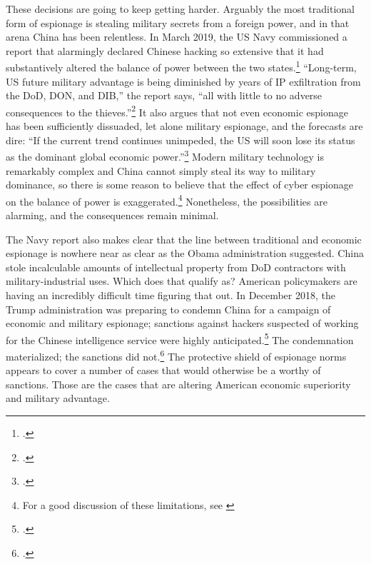 \documentclass{memoir}
\begin{document}
\begin{refsegment}
These decisions are going to keep getting harder. Arguably the most traditional form of espionage is stealing military secrets from a foreign power, and in that arena China has been relentless. In March 2019, the US Navy commissioned a report that alarmingly declared Chinese hacking so extensive that it had substantively altered the balance of power between the two states.\footcite{lubold_navy_2019} ``Long-term, US future military advantage is being diminished by years of IP exfiltration from the DoD, DON, and DIB,'' the report says, ``all with little to no adverse consequences to the thieves.''\footcite[p.~6]{bayer_cybersecurity_2019} It also argues that not even economic espionage has been sufficiently dissuaded, let alone military espionage, and the forecasts are dire: ``If the current trend continues unimpeded, the US will soon lose its status as the dominant global economic power.''\footcite[p.~5]{bayer_cybersecurity_2019} Modern military technology is remarkably complex and China cannot simply steal its way to military dominance, so there is some reason to believe that the effect of cyber espionage on the balance of power is exaggerated.\footnote{For a good discussion of these limitations, see \cite{gilli_why_2019}} Nonetheless, the possibilities are alarming, and the consequences remain minimal.

The Navy report also makes clear that the line between traditional and economic espionage is nowhere near as clear as the Obama administration suggested. China stole incalculable amounts of intellectual property from DoD contractors with military-industrial uses. Which does that qualify as? American policymakers are having an incredibly difficult time figuring that out. In December 2018, the Trump administration was preparing to condemn China for a campaign of economic and military espionage; sanctions against hackers suspected of working for the Chinese intelligence service were highly anticipated.\footcite{nakashima_trump_2018-1} The condemnation materialized; the sanctions did not.\footcite{barfield_new_2019} The protective shield of espionage norms appears to cover a number of cases that would otherwise be a worthy of sanctions. Those are the cases that are altering American economic superiority and military advantage.


\end{refsegment}
\end{document}
